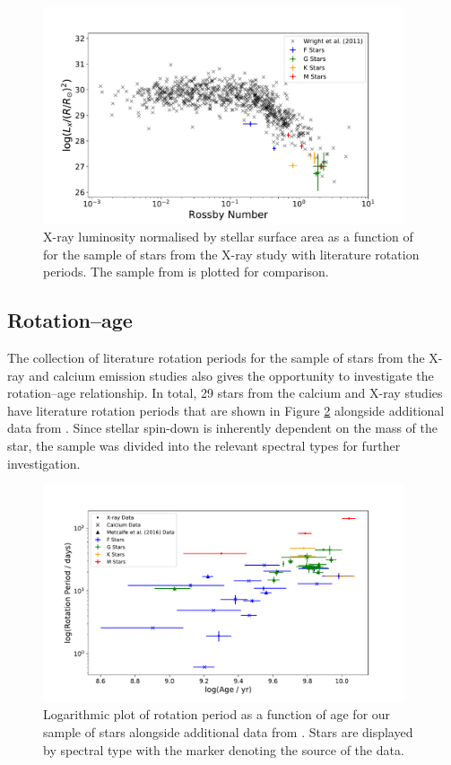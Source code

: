 \begin{figure}[!ht]
    \centering
    \includegraphics[width=0.95\textwidth]{Figures/5-Activity_rotation/lx_v_R0.pdf}
    \caption[$L_{x}$ as a function of \Ro]{X-ray luminosity normalised by stellar surface area as a function of \Ro for the sample of stars from the X-ray study with literature rotation periods. The sample from \citet{Wright_etal_2011} is plotted for comparison.}
    \label{fig:lx_v_ro}
\end{figure}

\subsection{Rotation--age}
\label{Chp5_results_rotation_age}
The collection of literature rotation periods for the sample of stars from the X-ray and calcium emission studies also gives the opportunity to investigate the rotation--age relationship. In total, 29 stars from the calcium and X-ray studies have literature rotation periods that are shown in Figure \ref{fig:full_sample_prot_v_age} alongside additional data from \citet{Metcalfe_etal_2016}. Since stellar spin-down is inherently dependent on the mass of the star, the sample was divided into the relevant spectral types for further investigation. 

\begin{figure}[!ht]
    \centering
    \includegraphics[width=0.95\textwidth]{Figures/5-Activity_rotation/prot_v_age.pdf}
    \caption[Rotation period as a function of age for full sample]{Logarithmic plot of rotation period as a function of age for our sample of stars alongside additional data from \citet{Metcalfe_etal_2016}. Stars are displayed by spectral type with the marker denoting the source of the data.}
    \label{fig:full_sample_prot_v_age}
\end{figure}

